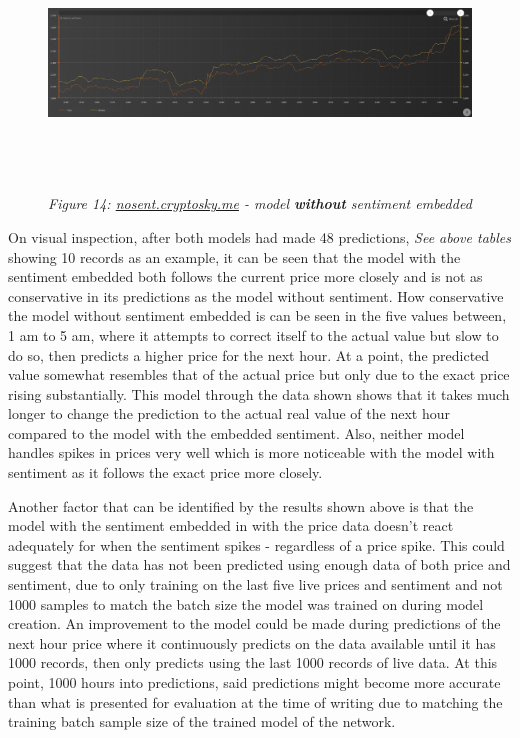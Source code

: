 \documentclass[oneside, 12pt]{article}
\begin{document}
\begin{figure}[hbt!]
	\centering
	\includegraphics[width=16cm,height=6cm]{images/without_sentiment.png}
	\begin{center}
		\textit{Figure 14: \url{nosent.cryptosky.me} - model \textbf{without} sentiment embedded}
	\end{center}
\end{figure}

\newpage
	
	On visual inspection, after both models had made 48 predictions, \textit{See above tables} showing 10 records as an example, it can be seen that the model with the sentiment embedded both follows the current price more closely and is not as conservative in its predictions as the model without sentiment. 
	How conservative the model without sentiment embedded is can be seen in the five values between, 1 am to 5 am, where it attempts to correct itself to the actual value but slow to do so, then predicts a higher price for the next hour. At a point, the predicted value somewhat resembles that of the actual price but only due to the exact price rising substantially.
	This model through the data shown shows that it takes much longer to change the prediction to the actual real value of the next hour compared to the model with the embedded sentiment. 
	Also, neither model handles spikes in prices very well which is more noticeable with the model with sentiment as it follows the exact price more closely.
	
	Another factor that can be identified by the results shown above is that the model with the sentiment embedded in with the price data doesn't react adequately for when the sentiment spikes - regardless of a price spike. This could suggest that the data has not been predicted using enough data of both price and sentiment, due to only training on the last five live prices and sentiment and not 1000 samples to match the batch size the model was trained on during model creation. An improvement to the model could be made during predictions of the next hour price where it continuously predicts on the data available until it has 1000 records, then only predicts using the last 1000 records of live data. At this point, 1000 hours into predictions, said predictions might become more accurate than what is presented for evaluation at the time of writing due to matching the training batch sample size of the trained model of the network.
	
\end{document}
